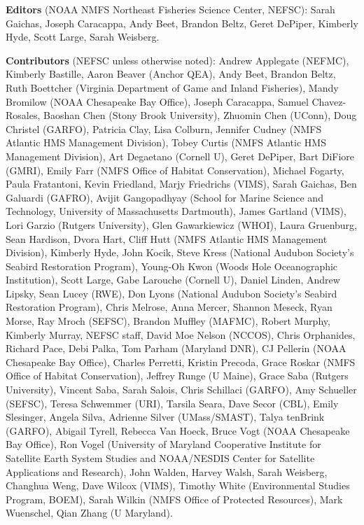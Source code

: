 \documentclass[
  10pt,
]{article}
\begin{document}
\textbf{Editors} (NOAA NMFS Northeast Fisheries Science Center, NEFSC): Sarah Gaichas, Joseph Caracappa, Andy Beet, Brandon Beltz, Geret DePiper, Kimberly Hyde, Scott Large, Sarah Weisberg.

\textbf{Contributors} (NEFSC unless otherwise noted): Andrew Applegate (NEFMC), Kimberly Bastille, Aaron Beaver (Anchor QEA), Andy Beet, Brandon Beltz, Ruth Boettcher (Virginia Department of Game and Inland Fisheries), Mandy Bromilow (NOAA Chesapeake Bay Office), Joseph Caracappa, Samuel Chavez-Rosales, Baoshan Chen (Stony Brook University), Zhuomin Chen (UConn), Doug Christel (GARFO), Patricia Clay, Lisa Colburn, Jennifer Cudney (NMFS Atlantic HMS Management Division), Tobey Curtis (NMFS Atlantic HMS Management Division), Art Degaetano (Cornell U), Geret DePiper, Bart DiFiore (GMRI), Emily Farr (NMFS Office of Habitat Conservation), Michael Fogarty, Paula Fratantoni, Kevin Friedland, Marjy Friedrichs (VIMS), Sarah Gaichas, Ben Galuardi (GAFRO), Avijit Gangopadhyay (School for Marine Science and Technology, University of Massachusetts Dartmouth), James Gartland (VIMS), Lori Garzio (Rutgers University), Glen Gawarkiewicz (WHOI), Laura Gruenburg, Sean Hardison, Dvora Hart, Cliff Hutt (NMFS Atlantic HMS Management Division), Kimberly Hyde, John Kocik, Steve Kress (National Audubon Society's Seabird Restoration Program), Young-Oh Kwon (Woods Hole Oceanographic Institution), Scott Large, Gabe Larouche (Cornell U), Daniel Linden, Andrew Lipsky, Sean Lucey (RWE), Don Lyons (National Audubon Society's Seabird Restoration Program), Chris Melrose, Anna Mercer, Shannon Meseck, Ryan Morse, Ray Mroch (SEFSC), Brandon Muffley (MAFMC), Robert Murphy, Kimberly Murray, NEFSC staff, David Moe Nelson (NCCOS), Chris Orphanides, Richard Pace, Debi Palka, Tom Parham (Maryland DNR), CJ Pellerin (NOAA Chesapeake Bay Office), Charles Perretti, Kristin Precoda, Grace Roskar (NMFS Office of Habitat Conservation), Jeffrey Runge (U Maine), Grace Saba (Rutgers University), Vincent Saba, Sarah Salois, Chris Schillaci (GARFO), Amy Schueller (SEFSC), Teresa Schwemmer (URI), Tarsila Seara, Dave Secor (CBL), Emily Slesinger, Angela Silva, Adrienne Silver (UMass/SMAST), Talya tenBrink (GARFO), Abigail Tyrell, Rebecca Van Hoeck, Bruce Vogt (NOAA Chesapeake Bay Office), Ron Vogel (University of Maryland Cooperative Institute for Satellite Earth System Studies and NOAA/NESDIS Center for Satellite Applications and Research), John Walden, Harvey Walsh, Sarah Weisberg, Changhua Weng, Dave Wilcox (VIMS), Timothy White (Environmental Studies Program, BOEM), Sarah Wilkin (NMFS Office of Protected Resources), Mark Wuenschel, Qian Zhang (U Maryland).
\end{document}
